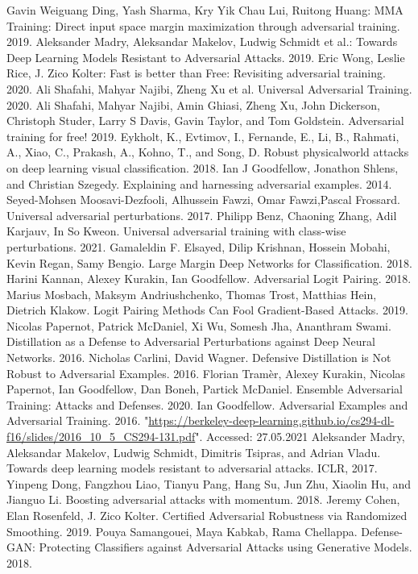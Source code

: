 \documentclass[conference]{IEEEtran}
\begin{document}
\begin{thebibliography}{00}

   Gavin Weiguang Ding, Yash Sharma, Kry Yik Chau Lui, Ruitong Huang: MMA Training: Direct input space margin maximization through adversarial training. 2019.
   Aleksander Madry, Aleksandar Makelov, Ludwig Schmidt et al.: Towards Deep Learning Models Resistant to Adversarial Attacks. 2019.
   Eric Wong, Leslie Rice, J. Zico Kolter: Fast is better than Free: Revisiting adversarial training. 2020.
   Ali Shafahi, Mahyar Najibi, Zheng Xu et al. Universal Adversarial Training. 2020.
   Ali Shafahi, Mahyar Najibi, Amin Ghiasi, Zheng Xu, John Dickerson, Christoph Studer, Larry S Davis, Gavin Taylor, and Tom Goldstein. Adversarial training for free! 2019.
   Eykholt, K., Evtimov, I., Fernande, E., Li, B., Rahmati, A., Xiao, C., Prakash, A., Kohno, T., and Song, D. Robust physicalworld attacks on deep learning visual classification. 2018.
   Ian J Goodfellow, Jonathon Shlens, and Christian Szegedy. Explaining and harnessing adversarial examples. 2014.
   Seyed-Mohsen Moosavi-Dezfooli, Alhussein Fawzi, Omar Fawzi,Pascal Frossard. Universal adversarial perturbations. 2017.
   Philipp Benz, Chaoning Zhang, Adil Karjauv, In So Kweon. Universal adversarial training with class-wise perturbations. 2021.
   Gamaleldin F. Elsayed, Dilip Krishnan, Hossein Mobahi, Kevin Regan, Samy Bengio. Large Margin Deep Networks for Classification. 2018.
   Harini Kannan, Alexey Kurakin, Ian Goodfellow. Adversarial Logit Pairing. 2018.
   Marius Mosbach, Maksym Andriushchenko, Thomas Trost, Matthias Hein, Dietrich Klakow. Logit Pairing Methods Can Fool Gradient-Based Attacks. 2019.
   Nicolas Papernot, Patrick McDaniel, Xi Wu, Somesh Jha, Ananthram Swami. Distillation as a Defense to Adversarial Perturbations against Deep Neural Networks. 2016.
   Nicholas Carlini, David Wagner. Defensive Distillation is Not Robust to Adversarial Examples. 2016.
   Florian Tramèr, Alexey Kurakin, Nicolas Papernot, Ian Goodfellow, Dan Boneh, Partick McDaniel. Ensemble Adversarial Training: Attacks and Defenses. 2020.
   Ian Goodfellow. Adversarial Examples and Adversarial Training. 2016. "\url{https://berkeley-deep-learning.github.io/cs294-dl-f16/slides/2016_10_5_CS294-131.pdf}". Accessed: 27.05.2021
   Aleksander Madry, Aleksandar Makelov, Ludwig Schmidt, Dimitris Tsipras, and Adrian Vladu. Towards deep learning models resistant to adversarial attacks. ICLR, 2017.
   Yinpeng Dong, Fangzhou Liao, Tianyu Pang, Hang Su, Jun Zhu, Xiaolin Hu, and Jianguo Li. Boosting adversarial attacks with momentum. 2018.
   Jeremy Cohen, Elan Rosenfeld, J. Zico Kolter. Certified Adversarial Robustness via Randomized Smoothing. 2019.
   Pouya Samangouei, Maya Kabkab, Rama Chellappa. Defense-GAN: Protecting Classifiers against Adversarial Attacks using Generative Models. 2018.

\end{thebibliography}
\end{document}

